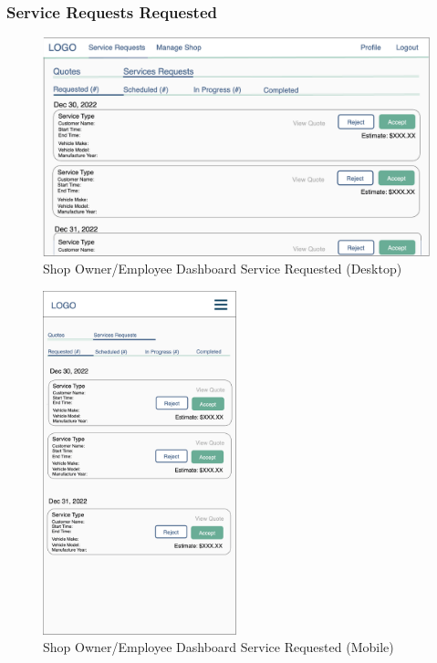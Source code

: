 \documentclass[12pt, titlepage]{article}
\begin{document}
\subsubsection{Service Requests \textemdash{} Requested}

\begin{figure}[H]
	\centering
	\includegraphics[width=\textwidth]{mockups/Shop Owner Dashboard (Service Requests - Requested) (Desktop).png}
	\caption{Shop Owner/Employee Dashboard \textemdash{} Service \textemdash{} Requested (Desktop)}
\end{figure}

\begin{figure}[H]
	\centering
	\includegraphics[width=0.5\textwidth]{mockups/Shop Owner Dashboard (Service Requests - Requested) (Mobile).png}
	\caption{Shop Owner/Employee Dashboard \textemdash{} Service \textemdash{} Requested (Mobile)}
\end{figure}
\end{document}
